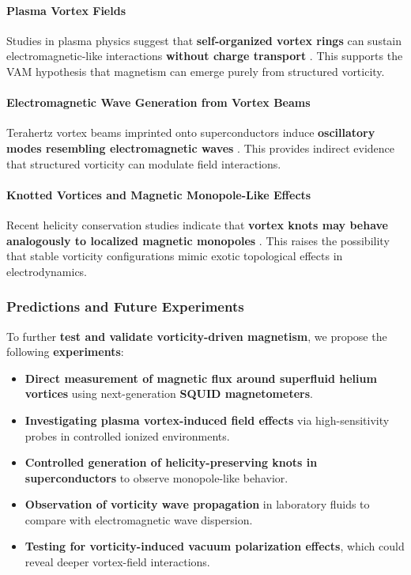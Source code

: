 \documentclass[a4paper,10pt]{article}
\begin{document}
\paragraph{Plasma Vortex Fields}
Studies in plasma physics suggest that \textbf{self-organized vortex rings} can sustain electromagnetic-like interactions \textbf{without charge transport} \cite{plasma_vortex_flows}. This supports the VAM hypothesis that magnetism can emerge purely from structured vorticity.

\paragraph{Electromagnetic Wave Generation from Vortex Beams}
Terahertz vortex beams imprinted onto superconductors induce \textbf{oscillatory modes resembling electromagnetic waves} \cite{higgs_waves_vortex}. This provides indirect evidence that structured vorticity can modulate field interactions.

\paragraph{Knotted Vortices and Magnetic Monopole-Like Effects}
Recent helicity conservation studies indicate that \textbf{vortex knots may behave analogously to localized magnetic monopoles} \cite{collected_helicity_papers}. This raises the possibility that stable vorticity configurations mimic exotic topological effects in electrodynamics.

\subsubsection*{Predictions and Future Experiments}
To further \textbf{test and validate vorticity-driven magnetism}, we propose the following \textbf{experiments}:

\begin{itemize}
    \item \textbf{Direct measurement of magnetic flux around superfluid helium vortices} using next-generation \textbf{SQUID magnetometers}.
    \item \textbf{Investigating plasma vortex-induced field effects} via high-sensitivity probes in controlled ionized environments.
    \item \textbf{Controlled generation of helicity-preserving knots in superconductors} to observe monopole-like behavior.
    \item \textbf{Observation of vorticity wave propagation} in laboratory fluids to compare with electromagnetic wave dispersion.
    \item \textbf{Testing for vorticity-induced vacuum polarization effects}, which could reveal deeper vortex-field interactions.
\end{itemize}
\end{document}
